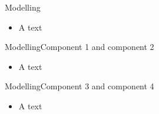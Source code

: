 \begin{frame}{Modelling}{}
	\begin{itemize}
		\item A text
	\end{itemize}
\end{frame}


\begin{frame}{Modelling}{Component 1 and component 2}
	\begin{itemize}
		\item A text
	\end{itemize}\bigskip
\end{frame}



\begin{frame}{Modelling}{Component 3 and component 4}
	\begin{itemize}
		\item A text
	\end{itemize}\bigskip
\end{frame}